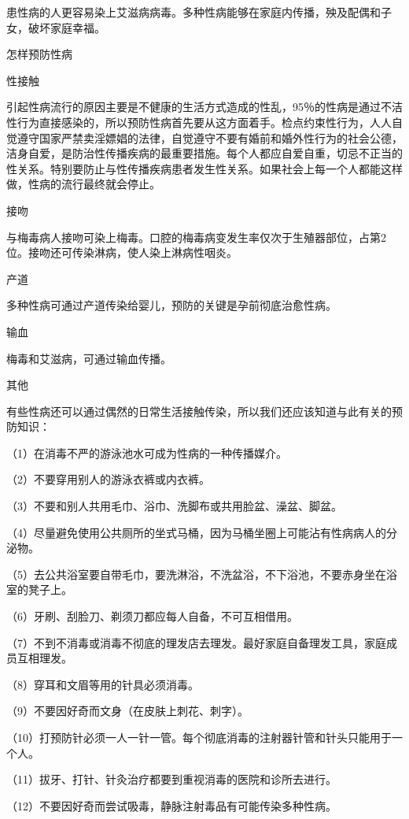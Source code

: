 \documentclass[12pt,UTF8,openany]{ctexbook}
\begin{document}
患性病的人更容易染上艾滋病病毒。多种性病能够在家庭内传播，殃及配偶和子女，破坏家庭幸福。





怎样预防性病


性接触

引起性病流行的原因主要是不健康的生活方式造成的性乱，95％的性病是通过不洁性行为直接感染的，所以预防性病首先要从这方面着手。检点约束性行为，人人自觉遵守国家严禁卖淫嫖娼的法律，自觉遵守不要有婚前和婚外性行为的社会公德，洁身自爱，是防治性传播疾病的最重要措施。每个人都应自爱自重，切忌不正当的性关系。特别要防止与性传播疾病患者发生性关系。如果社会上每一个人都能这样做，性病的流行最终就会停止。

接吻

与梅毒病人接吻可染上梅毒。口腔的梅毒病变发生率仅次于生殖器部位，占第2位。接吻还可传染淋病，使人染上淋病性咽炎。

产道

多种性病可通过产道传染给婴儿，预防的关键是孕前彻底治愈性病。

输血

梅毒和艾滋病，可通过输血传播。

其他

有些性病还可以通过偶然的日常生活接触传染，所以我们还应该知道与此有关的预防知识：

（1）在消毒不严的游泳池水可成为性病的一种传播媒介。

（2）不要穿用别人的游泳衣裤或内衣裤。

（3）不要和别人共用毛巾、浴巾、洗脚布或共用脸盆、澡盆、脚盆。

（4）尽量避免使用公共厕所的坐式马桶，因为马桶坐圈上可能沾有性病病人的分泌物。

（5）去公共浴室要自带毛巾，要洗淋浴，不洗盆浴，不下浴池，不要赤身坐在浴室的凳子上。

（6）牙刷、刮脸刀、剃须刀都应每人自备，不可互相借用。

（7）不到不消毒或消毒不彻底的理发店去理发。最好家庭自备理发工具，家庭成员互相理发。

（8）穿耳和文眉等用的针具必须消毒。

（9）不要因好奇而文身（在皮肤上刺花、刺字）。

（10）打预防针必须一人一针一管。每个彻底消毒的注射器针管和针头只能用于一个人。

（11）拔牙、打针、针灸治疗都要到重视消毒的医院和诊所去进行。

（12）不要因好奇而尝试吸毒，静脉注射毒品有可能传染多种性病。
\end{document}
